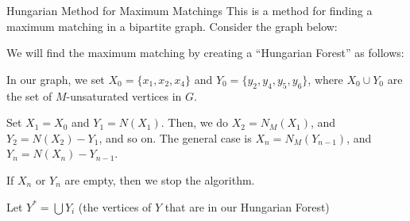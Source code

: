\documentclass[10pt]{extarticle}
\begin{document}
  \begin{problem}{Hungarian Method for Maximum Matchings}
    This is a method for finding a maximum matching in a bipartite graph. Consider the graph below:
    \begin{center}
    \end{center}
    We will find the maximum matching by creating a ``Hungarian Forest'' as follows:
    \begin{description}[font=\normalfont\scshape]
      \item[Initialization] In our graph, we set $X_0 = \{x_1,x_2,x_4\}$ and $Y_0 = \{y_2,y_4,y_5,y_6\}$, where $X_0 \cup Y_0$ are the set of $M$-unsaturated vertices in $G$.
      \item[Iteration] Set $X_1 = X_0$ and $Y_1 = N(X_1)$. Then, we do $X_2 = N_M(X_1)$, and $Y_2 = N(X_2) - Y_1$, and so on. The general case is $X_n = N_M(Y_{n-1})$, and $Y_n = N(X_n) - Y_{n-1}$.
      \item[End condition] If $X_n$ or $Y_n$ are empty, then we stop the algorithm.
    \end{description}
    Let $Y^* = \bigcup Y_i$ (the vertices of $Y$ that are in our Hungarian Forest)
  \end{problem}
\end{document}
